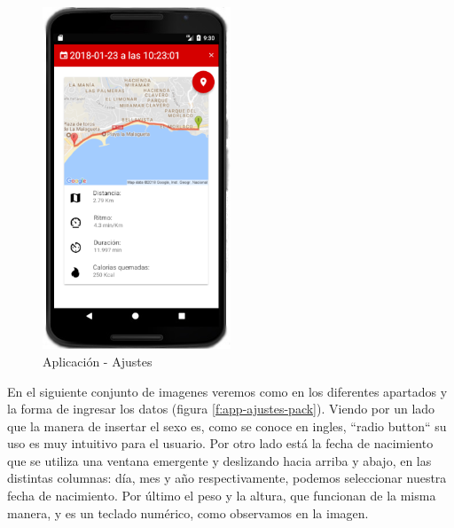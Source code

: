 \documentclass[a4paper, 11pt]{article}
\begin{document}
\begin{itemize}
                    \begin{figure}[H]
                     \centering
                     \includegraphics[width=0.5\textwidth]{10ajustes-completo}
                     \caption{Aplicación - Ajustes}
                     \label{f:app-ajustes-completo}
                    \end{figure}

      En el siguiente conjunto de imagenes veremos como en los diferentes apartados y la forma de ingresar los
      datos (figura \ref{f:app-ajustes-pack}). Viendo por un lado que la manera de insertar el sexo es, como se
      conoce en ingles, ``radio button`` su uso es muy intuitivo para el usuario. Por otro lado está la fecha de
      nacimiento que se utiliza una ventana emergente y deslizando hacia arriba y abajo, en las distintas columnas:
      día, mes y año respectivamente, podemos seleccionar nuestra fecha de nacimiento. Por último el peso y la
      altura, que funcionan de la misma manera, y es un teclado numérico, como observamos en la imagen.\\


\end{itemize}
\end{document}
